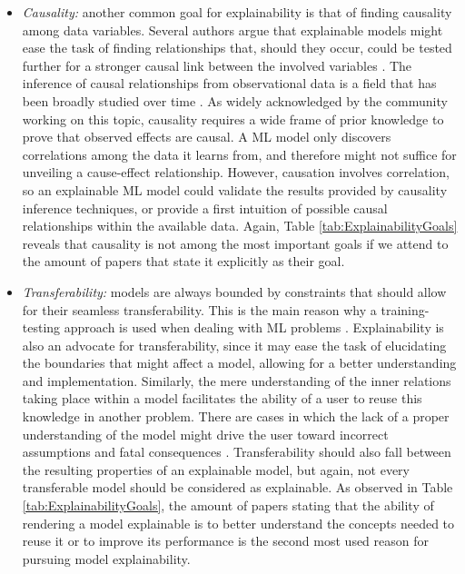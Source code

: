 \documentclass[final]{elsarticle}
\begin{document}
\begin{itemize}[leftmargin=*]
    \item \textit{Causality:} another common goal for explainability is that of finding causality among data variables. Several authors argue that explainable models might ease the task of finding relationships that, should they occur, could be tested further for a stronger causal link between the involved variables \cite{wang1999Causality,rani2006Causality}. The inference of causal relationships from observational data is a field that has been broadly studied over time \cite{pearl2009causality}. As widely acknowledged by the community working on this topic, causality requires a wide frame of prior knowledge to prove that observed effects are causal. A ML model only discovers correlations among the data it learns from, and therefore might not suffice for unveiling a cause-effect relationship. However, causation involves correlation, so an explainable ML model could validate the results provided by causality inference techniques, or provide a first intuition of possible causal relationships within the available data. Again, Table \ref{tab:ExplainabilityGoals} reveals that causality is not among the most important goals if we attend to the amount of papers that state it explicitly as their goal.
    
    \item \textit{Transferability:} models are always bounded by constraints that should allow for their seamless transferability. This is the main reason why a training-testing approach is used when dealing with ML problems \cite{kuhn2013appliedTransferability, james2013Transferability}. Explainability is also an advocate for transferability, since it may ease the task of elucidating the boundaries that might affect a model, allowing for a better understanding and implementation. Similarly, the mere understanding of the inner relations taking place within a model facilitates the ability of a user to reuse this knowledge in another problem. There are cases in which the lack of a proper understanding of the model might drive the user toward incorrect assumptions and fatal consequences \cite{caruana2015Transferability,szegedy2013Transferability}. Transferability should also fall between the resulting properties of an explainable model, but again, not every transferable model should be considered as explainable. As observed in Table \ref{tab:ExplainabilityGoals}, the amount of papers stating that the ability of rendering a model explainable is to better understand the concepts needed to reuse it or to improve its performance is the second most used reason for pursuing model explainability.
    

\end{itemize}
\end{document}
